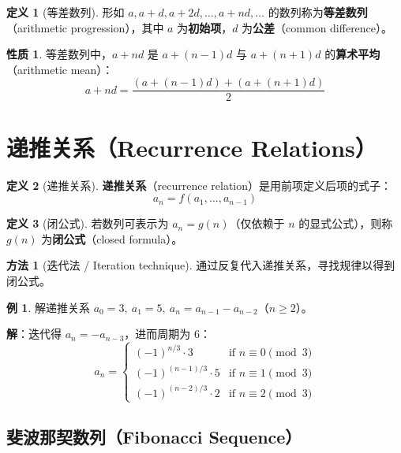 \documentclass[UTF8,11pt,a4paper]{ctexbook}   %
\theoremstyle{definition}
\newtheorem{definition}{定义}[section]
\newtheorem{example}{例}[section]
\newtheorem{property}{性质}[section]
\newtheorem{method}{方法}[section]
\begin{document}
\begin{definition}[等差数列]
形如 $a, a+d, a+2d, \ldots, a+nd, \ldots$ 的数列称为\textbf{等差数列}（arithmetic progression），其中 $a$ 为\textbf{初始项}，$d$ 为\textbf{公差}（common difference）。
\end{definition}

\begin{property}
等差数列中，$a+nd$ 是 $a+(n-1)d$ 与 $a+(n+1)d$ 的\textbf{算术平均}（arithmetic mean）：
\[
a+nd = \frac{(a+(n-1)d) + (a+(n+1)d)}{2}
\]
\end{property}

\section{递推关系（Recurrence Relations）}

\begin{definition}[递推关系]
\textbf{递推关系}（recurrence relation）是用前项定义后项的式子：
\[
a_n = f(a_1, \ldots, a_{n-1})
\]
\end{definition}

\begin{definition}[闭公式]
若数列可表示为 $a_n = g(n)$（仅依赖于 $n$ 的显式公式），则称 $g(n)$ 为\textbf{闭公式}（closed formula）。
\end{definition}

\begin{method}[迭代法 / Iteration technique]
通过反复代入递推关系，寻找规律以得到闭公式。
\end{method}

\begin{example}
解递推关系 $a_0 = 3,\ a_1 = 5,\ a_n = a_{n-1} - a_{n-2}$（$n \geq 2$）。

\textbf{解}：迭代得 $a_n = -a_{n-3}$，进而周期为 6：
\[
a_n = \begin{cases}
(-1)^{n/3} \cdot 3 & \text{if } n \equiv 0 \pmod{3} \\
(-1)^{(n-1)/3} \cdot 5 & \text{if } n \equiv 1 \pmod{3} \\
(-1)^{(n-2)/3} \cdot 2 & \text{if } n \equiv 2 \pmod{3}
\end{cases}
\]
\end{example}

\subsection{斐波那契数列（Fibonacci Sequence）}
\end{document}
